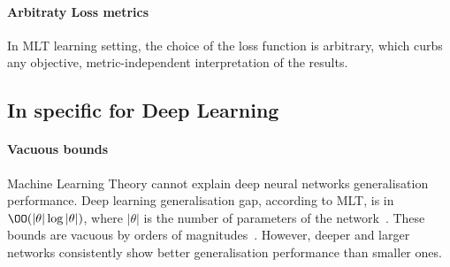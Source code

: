 \paragraph{Arbitraty Loss metrics} In \ac{MLT} learning setting, the choice of the loss function is arbitrary, which curbs any objective, metric-independent interpretation of the results.


\subsection{In specific for Deep Learning}
\paragraph{Vacuous bounds}
Machine Learning Theory cannot explain deep neural networks generalisation performance. Deep learning generalisation gap, according to \ac{MLT}, is in \(\OO(|\theta| \log |\theta|)\), where \(|\theta|\) is the number of parameters of the network~\cite{kakade:2008}. These bounds are vacuous by orders of magnitudes~\cite{zhou:2019, zhang:2016}. However, deeper and larger networks consistently show better generalisation performance than smaller ones.
